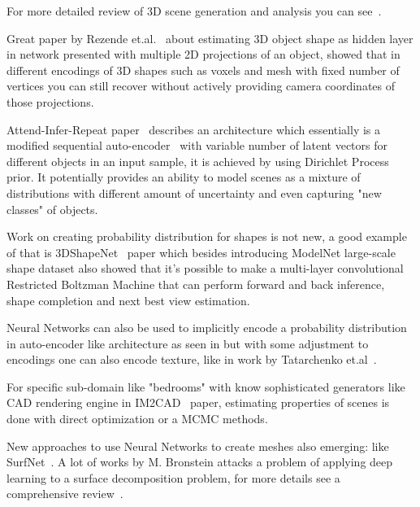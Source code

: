 For more detailed review of 3D scene generation and analysis you can see~\cite{2017arXiv170609577M}.

Great paper by Rezende et.al.~\cite{rezende2016unsupervised} about estimating 3D object shape as hidden layer in network presented with multiple 2D projections of an object, showed that in different encodings of 3D shapes such as voxels and mesh with fixed number of vertices you can still recover without actively providing camera coordinates of those projections. 

Attend-Infer-Repeat paper~\cite{eslami2016attend} describes an architecture which essentially is a modified sequential auto-encoder~\cite{gregor2015draw} with variable number of latent vectors for different objects in an input sample, it is achieved by using Dirichlet Process prior. It potentially provides an ability to model scenes as a mixture of distributions with different amount of uncertainty and even capturing "new classes" of objects.

Work on creating probability distribution for shapes is not new, a good example of that is 3DShapeNet~\cite{wu20153d} paper which besides introducing ModelNet large-scale shape dataset also showed that it's possible to make a multi-layer convolutional Restricted Boltzman Machine that can perform forward and back inference, shape completion and next best view estimation.

Neural Networks can also be used to implicitly encode a probability distribution in auto-encoder like architecture as seen in \cite{dai2016shape,kulkarni2015deep,gwak2017weakly} but with some adjustment to encodings one can also encode texture, like in work by Tatarchenko et.al~\cite{tatarchenko2016multi}.

For specific sub-domain like "bedrooms" with know sophisticated generators like CAD rendering engine in IM2CAD~\cite{Izadinia_2017_CVPR} paper, estimating properties of scenes is done with direct optimization or a MCMC methods. 

New approaches to use Neural Networks to create meshes also emerging: like SurfNet~\cite{Sinha_2017_CVPR}. A lot of works by M. Bronstein attacks a problem of applying deep learning to a surface decomposition problem, for more details see a comprehensive review~\cite{2016arXiv161108097B}.

